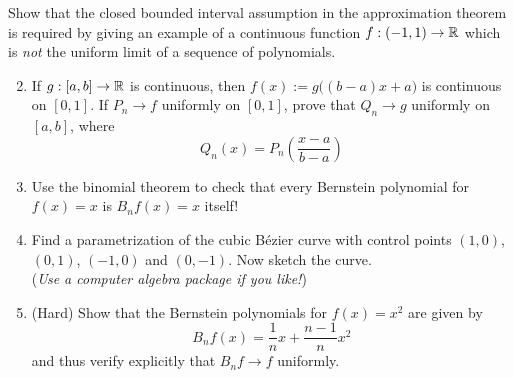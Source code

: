 \begin{exercises}
\exstart Show that the closed bounded interval assumption in the approximation theorem is required by giving an example of a continuous function $f:(-1,1)\to\mathbb{R}$ which is \emph{not} the uniform limit of a sequence of polynomials.
\begin{enumerate}\setcounter{enumi}{1}  
  \item If $g:[a,b]\to\mathbb{R}$ is continuous, then $f(x):=g\bigl((b-a)x+a\bigr)$ is continuous on $[0,1]$. If $P_n\to f$ uniformly on $[0,1]$, prove that $Q_n\to g$ uniformly on $[a,b]$, where
	\[Q_n(x)= P_n\left(\frac{x-a}{b-a}\right)\]

	\item Use the binomial theorem to check that every Bernstein polynomial for $f(x)=x$ is $B_nf(x)=x$ itself!
  
	\item Find a parametrization of the cubic Bézier curve with control points $(1,0)$, $(0,1)$, $(-1,0)$ and $(0,-1)$. Now sketch the curve.\\
	(\emph{Use a computer algebra package if you like!})
	
	\item (Hard) Show that the Bernstein polynomials for $f(x)=x^2$ are given by 
	\[B_nf(x)=\frac 1nx+\frac{n-1}nx^2\]
	and thus verify explicitly that $B_nf\to f$ uniformly.
\end{enumerate}
\end{exercises}
